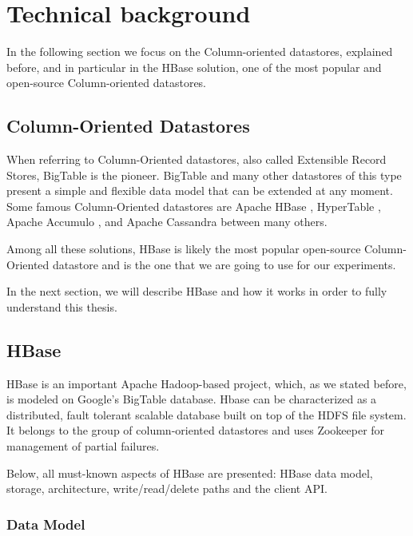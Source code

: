 \chapter{Technical background}
\label{chapter:technical background} 

In the following section we focus on the Column-oriented datastores, explained before, and in particular in the HBase solution, one of the most popular and open-source Column-oriented datastores.

\section{Column-Oriented Datastores}

When referring to Column-Oriented datastores, also called Extensible Record Stores, BigTable is the pioneer. BigTable and many other datastores of this type present a simple and flexible data model that can be extended at any moment.
Some famous Column-Oriented datastores are Apache HBase \cite{ApacheHBase}, HyperTable \cite{HyperTable}, Apache Accumulo \cite{ApacheAccumulo}, and Apache Cassandra \cite{ApacheCassandra} between many others.
\par
Among all these solutions, HBase \cite{george2011hbase} is likely the most popular open-source Column-Oriented datastore and is the one that we are going to use for our experiments.
\par
In the next section, we will describe HBase and how it works in order to fully understand this thesis.


\section{HBase}


HBase is an important Apache Hadoop-based project, which, as we stated before, is modeled on Google's BigTable database. Hbase can be characterized as a distributed, fault tolerant scalable database built on top of the HDFS file system. It belongs to the group of column-oriented datastores and uses Zookeeper for management of partial failures.
\par
Below, all must-known aspects of HBase are presented: HBase data model, storage, architecture, write/read/delete paths and the client API.


\subsection{Data Model}

